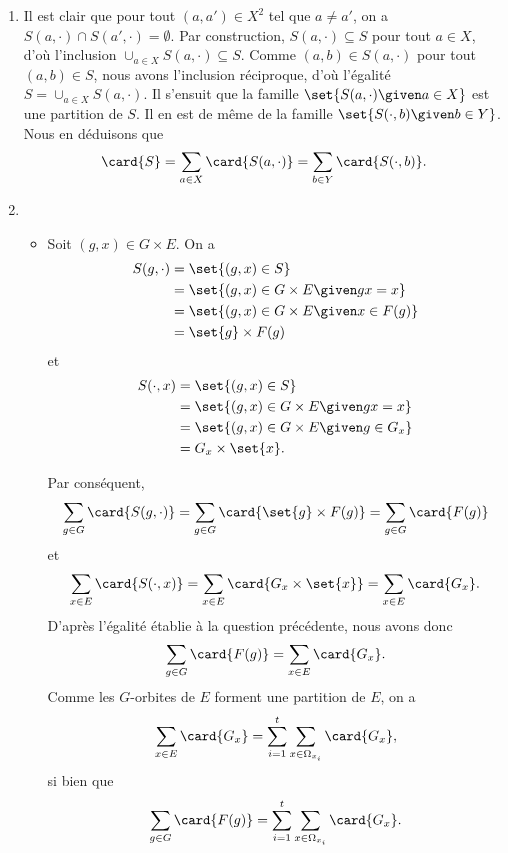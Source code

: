 \begin{enumerate}
  \item 
    Il est clair que pour tout $(a,a')\in X^2$ tel que $a\neq a'$, on a $S(a,\cdot) \cap S(a',\cdot) = \emptyset$.
    Par construction, $S(a,\cdot) \subseteq S$ pour tout $a\in X$, d'où l'inclusion $\cup_{a\in X} S(a,\cdot) \subseteq S$.
    Comme $(a,b)\in S(a,\cdot)$ pour tout $(a,b)\in S$, nous avons l'inclusion réciproque, d'où l'égalité $S = \cup_{a\in X} S(a,\cdot)$.
    Il s'ensuit que la famille $\set{S(a,\cdot) \given a\in X}$ est une partition de $S$.
    Il en est de même de la famille $\set{S(\cdot,b) \given b\in Y}$.
    Nous en déduisons que
    \[
      \card{S} = \sum_{a\in X} \card{S(a,\cdot)} = \sum_{b\in Y} \card{S(\cdot,b)}.
    \]

  \item
    \begin{itemize}
      \item 
        Soit $(g,x)\in G\times E$.
        On a 
        \begin{align*}
          S(g,\cdot) &= \set{(g,x)\in S} \\
                     &= \set{(g,x)\in G\times E \given gx = x} \\ 
                     &= \set{(g,x)\in G\times E \given x\in F(g) } \\
                     &= \set{g}\times F(g)
        \end{align*}
        et
        \begin{align*}
          S(\cdot,x) &= \set{(g,x)\in S} \\
                     &= \set{(g,x)\in G\times E \given gx = x} \\
                     &= \set{(g,x)\in G\times E \given g\in G_x } \\
                     &= G_x\times\set{x}.
        \end{align*}

        Par conséquent,
        \[
          \sum_{g\in G} \card{S(g,\cdot)} 
            = \sum_{g\in G} \card{\set{g}\times F(g)} 
            = \sum_{g\in G} \card{F(g)}
        \]
        et
        \[
          \sum_{x\in E} \card{S(\cdot,x)}
            = \sum_{x\in E} \card{G_x\times\set{x}}
            = \sum_{x\in E} \card{G_x}.
        \]
        D'après l'égalité établie à la question précédente, nous avons donc
        \[
          \sum_{g\in G} \card{F(g)} = \sum_{x\in E} \card{G_x}.
        \]
        Comme les $G$-orbites de $E$ forment une partition de $E$, on a
        \[
          \sum_{x\in E} \card{G_x} = \sum_{i = 1}^t \sum_{x\in\Omega_{x_i}} \card{G_x},
        \]
        si bien que
        \[
          \sum_{g\in G} \card{F(g)} = \sum_{i = 1}^t \sum_{x\in\Omega_{x_i}} \card{G_x}.
        \]


\end{itemize}
\end{enumerate}
